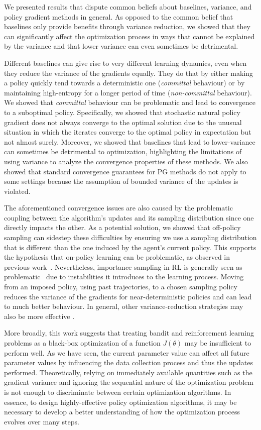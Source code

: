 We presented results that dispute common beliefs about baselines, variance, and policy gradient methods in general. 
As opposed to the common belief that baselines only provide benefits through variance reduction, we showed that they can significantly affect the optimization process in ways that cannot be explained by the variance and that lower variance can even sometimes be detrimental.

Different baselines can give rise to very different learning dynamics, even when they reduce the variance of the gradients equally. They do that by either making a policy quickly tend towards a deterministic one (\emph{committal} behaviour) or by maintaining high-entropy for a longer period of time (\emph{non-committal} behaviour). We showed that \textit{committal} behaviour can be problematic and lead to convergence to a suboptimal policy. Specifically, we showed that stochastic natural policy gradient does not always converge to the optimal solution due to the unusual situation in which the iterates converge to the optimal policy in expectation but not almost surely. 
Moreover, we showed that baselines that lead to lower-variance can sometimes be detrimental to optimization, highlighting the limitations of using variance to analyze the convergence properties of these methods. 
We also showed that standard convergence guarantees for PG methods do not apply to some settings because the assumption of bounded variance of the updates is violated.

The aforementioned convergence issues are also caused by the problematic coupling between the algorithm's updates and its sampling distribution since one directly impacts the other. As a potential solution, we showed that off-policy sampling can sidestep these difficulties by ensuring we use a sampling distribution that is different than the one induced by the agent's current policy. This supports the hypothesis that on-policy learning can be problematic, as observed in previous work~\citep{schaul2019ray, hennes2020neural}. Nevertheless, importance sampling in RL is generally seen as problematic~\citep{vanHasselt2018deadly_triad} due to instabilities it introduces to the learning process. Moving from an imposed policy, using past trajectories, to a chosen sampling policy reduces the variance of the gradients for near-deterministic policies and can lead to much better behaviour. In general, other variance-reduction strategies may also be more effective \cite{xu2019sample}.

More broadly, this work suggests that treating bandit and reinforcement learning problems as a black-box optimization of a function $J(\theta)$ may be insufficient to perform well. As we have seen, the current parameter value can affect all future parameter values by influencing the data collection process and thus the updates performed. Theoretically, relying on immediately available quantities such as the gradient variance and ignoring the sequential nature of the optimization problem is not enough to discriminate between certain optimization algorithms. In essence, to design highly-effective policy optimization algorithms, it may be necessary to develop a better understanding of how the optimization process evolves over many steps. 


